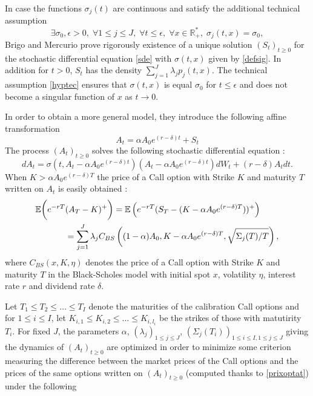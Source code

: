 \documentclass[11pt]{article}
\begin{document}
In case the functions $\sigma_j(t)$ are continuous and satisfy the
additional technical assumption \begin{equation}
   \exists \sigma_0,\epsilon>0,\;\forall
1\leq j\leq J,\;\forall t\leq\epsilon,\;\forall x\in{\mathbb
  R}_+^*,\;\sigma_j(t,x)=\sigma_0,\label{hyptec}
\end{equation}
Brigo and Mercurio \cite{BRME} \cite{BRME2} prove rigorously existence
of a unique solution $(S_t)_{t\geq 0}$ for the stochastic differential equation \eqref{sde} with
$\sigma(t,x)$ given by \eqref{defsig}. In addition for $t>0$, $S_t$ has
the density $\sum_{j=1}^J\lambda_jp_j(t,x)$. The technical assumption
\eqref{hyptec} ensures that $\sigma(t,x)$ is equal $\sigma_0$ for $t\leq
\epsilon$ and does not become a singular function of $x$ as
$t\rightarrow 0$.\par
In order to obtain a more general model, they introduce the following
affine transformation
$$A_t=\alpha A_0e^{(r-\delta)t}+S_t$$
The process $(A_t)_{t\geq 0}$ solves the following stochastic
differential equation :
$$dA_t=\sigma(t,A_t-\alpha A_0e^{(r-\delta)t})(A_t-\alpha
A_0e^{(r-\delta)t})dW_t+(r-\delta)A_tdt.$$
When $K>\alpha A_0e^{(r-\delta)T}$ the price of a Call option with
Strike $K$ and maturity $T$ written on $A_t$ is easily obtained :
\begin{align}
   {\mathbb E}\bigg(e^{-rT}&(A_T-K)^+\bigg)={\mathbb
  E}\left(e^{-rT}(S_T-(K-\alpha A_0e^{(r-\delta)T}))^+\right)\notag\\&=\sum_{j=1}^J\lambda_jC_{BS}\left((1-\alpha)A_0,K-\alpha
  A_0e^{(r-\delta)T},
  \sqrt{\Sigma_j(T)/T}\right)\label{prixoptat},
\end{align}
where $C_{BS}(x,K,\eta)$ denotes the price of a Call option with Strike
  $K$ and maturity $T$ in the Black-Scholes model with initial spot $x$,
  volatility $\eta$, interest rate $r$ and dividend rate $\delta$.\par
Let $T_1\leq T_2\leq \hdots\leq T_I$ denote the maturities of the
  calibration Call options and for $1\leq i\leq I$, let $K_{i,1}\leq
  K_{i,2}\leq \hdots\leq K_{i,l_i}$ be the strikes of those with
  matutirity $T_i$. For fixed $J$, the parameters $\alpha$,
  $(\lambda_j)_{1\leq j\leq J}$, $(\Sigma_j(T_i))_{1\leq i\leq I,1\leq
  j\leq J}$ giving the dynamics of $(A_t)_{t\geq 0}$
  are optimized in order to minimize some criterion measuring the difference
  between the market prices of the Call options and the prices of the
  same options written on $(A_t)_{t\geq 0}$ (computed thanks
  to \eqref{prixoptat}) under the following
\end{document}
